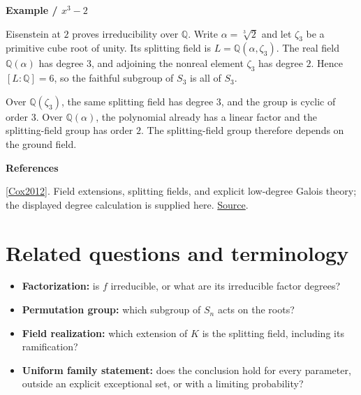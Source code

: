 \documentclass[11pt,a4paper,oneside,openany]{book}
\newenvironment{sources}{\par\smallskip\begingroup\footnotesize\color{atlasgray}\leftskip=10pt\setlength{\parskip}{2pt}}{\par\endgroup\smallskip}
\begin{document}
\begin{atlasblock}[standard]
\textbf{\sffamily Example  /  \(x^3-2\)}\par\smallskip
\color{black} Eisenstein at \(2\) proves irreducibility over \(\mathbb Q\). Write \(\alpha=\sqrt[3]{2}\) and let \(\zeta_3\) be a primitive cube root of unity. Its splitting field is \(L=\mathbb Q(\alpha,\zeta_3)\). The real field \(\mathbb Q(\alpha)\) has degree \(3\), and adjoining the nonreal element \(\zeta_3\) has degree \(2\). Hence \([L:\mathbb Q]=6\), so the faithful subgroup of \(S_3\) is all of \(S_3\).\par
\color{black} Over \(\mathbb Q(\zeta_3)\), the same splitting field has degree \(3\), and the group is cyclic of order \(3\). Over \(\mathbb Q(\alpha)\), the polynomial already has a linear factor and the splitting-field group has order \(2\). The splitting-field group therefore depends on the ground field.\par
\end{atlasblock}\color{black}
\begin{sources}
\textbf{References}\par\smallskip
\noindent\hyperlink{ref:Cox2012}{[Cox2012]}. Field extensions, splitting fields, and explicit low-degree Galois theory; the displayed degree calculation is supplied here. \href{https://onlinelibrary.wiley.com/doi/book/10.1002/9781118218457}{Source}.\par
\end{sources}\color{black}
\section{Related questions and terminology}

\begin{itemize}
\item\leavevmode\color{black} \textbf{Factorization:} is \(f\) irreducible, or what are its irreducible factor degrees?
\item\leavevmode\color{black} \textbf{Permutation group:} which subgroup of \(S_n\) acts on the roots?
\item\leavevmode\color{black} \textbf{Field realization:} which extension of \(K\) is the splitting field, including its ramification?
\item\leavevmode\color{black} \textbf{Uniform family statement:} does the conclusion hold for every parameter, outside an explicit exceptional set, or with a limiting probability?
\end{itemize}
\end{document}
